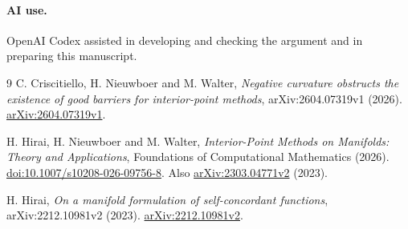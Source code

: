 \documentclass[11pt]{article}
\begin{document}
\paragraph{AI use.}
OpenAI Codex assisted in developing and checking the argument and in
preparing this manuscript.

\begin{thebibliography}{9}
C. Criscitiello, H. Nieuwboer and M. Walter,
\emph{Negative curvature obstructs the existence of good barriers for
interior-point methods},
arXiv:2604.07319v1 (2026).
\href{https://arxiv.org/abs/2604.07319v1}{arXiv:2604.07319v1}.

H. Hirai, H. Nieuwboer and M. Walter,
\emph{Interior-Point Methods on Manifolds: Theory and Applications},
Foundations of Computational Mathematics (2026).
\href{https://doi.org/10.1007/s10208-026-09756-8}{doi:10.1007/s10208-026-09756-8}.
Also \href{https://arxiv.org/abs/2303.04771v2}{arXiv:2303.04771v2} (2023).

H. Hirai,
\emph{On a manifold formulation of self-concordant functions},
arXiv:2212.10981v2 (2023).
\href{https://arxiv.org/abs/2212.10981v2}{arXiv:2212.10981v2}.
\end{thebibliography}
\end{document}
